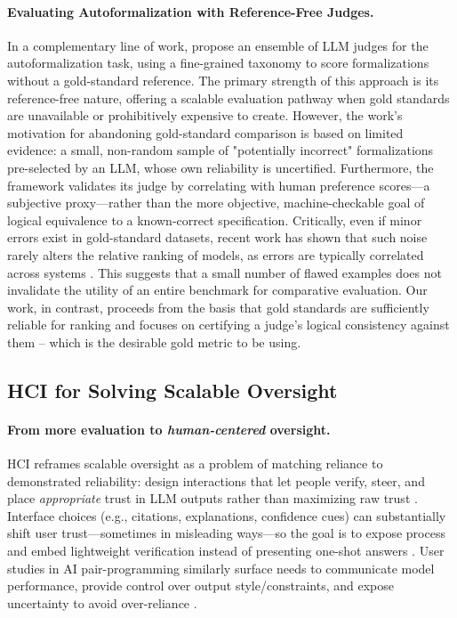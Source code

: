 \documentclass{article}
\begin{document}
\paragraph{Evaluating Autoformalization with Reference-Free Judges.}
In a complementary line of work, \citet{zhang2025goldstandardsepistemicensemble} propose an ensemble of LLM judges for the autoformalization task, using a fine-grained taxonomy to score formalizations without a gold-standard reference.
The primary strength of this approach is its reference-free nature, offering a scalable evaluation pathway when gold standards are unavailable or prohibitively expensive to create.
However, the work's motivation for abandoning gold-standard comparison is based on limited evidence: a small, non-random sample of "potentially incorrect" formalizations pre-selected by an LLM, whose own reliability is uncertified.
Furthermore, the framework validates its judge by correlating with human preference scores—a subjective proxy—rather than the more objective, machine-checkable goal of logical equivalence to a known-correct specification.
Critically, even if minor errors exist in gold-standard datasets, recent work has shown that such noise rarely alters the relative ranking of models, as errors are typically correlated across systems \citep{salaudeen2024imagenot}.
This suggests that a small number of flawed examples does not invalidate the utility of an entire benchmark for comparative evaluation.
Our work, in contrast, proceeds from the basis that gold standards are sufficiently reliable for ranking and focuses on certifying a judge's logical consistency against them -- which is the desirable gold metric to be using.

\subsection{HCI for Solving Scalable Oversight}

\paragraph{From more evaluation to \emph{human-centered} oversight.}
HCI reframes scalable oversight as a problem of matching reliance to demonstrated reliability: design interactions that let people verify, steer, and place \emph{appropriate} trust in LLM outputs rather than maximizing raw trust \citep{bach2022trusthci}. Interface choices (e.g., citations, explanations, confidence cues) can substantially shift user trust---sometimes in misleading ways---so the goal is to expose process and embed lightweight verification instead of presenting one-shot answers \citep{ding2025citations}. User studies in AI pair-programming similarly surface needs to communicate model performance, provide control over output style/constraints, and expose uncertainty to avoid over-reliance \citep{wang2024trustcode}.%
\end{document}
